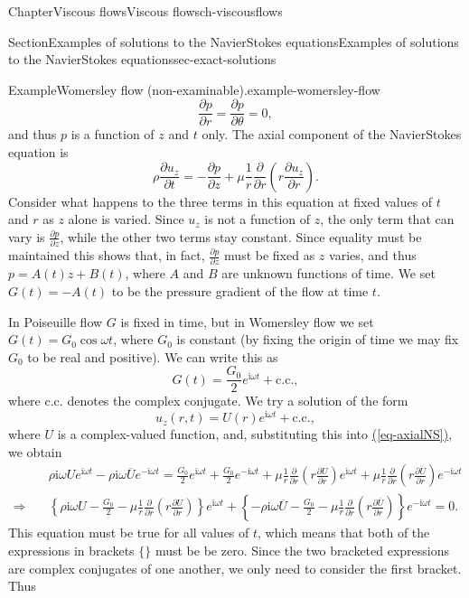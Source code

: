 \documentclass[oneside,10pt,]{book}
\newcommand{\xreffont}{\relax}
\numberwithin{equation}{section}
\newcommand{\im}{\mathrm{i}}
\newcommand{\pd}[2]{\frac{\partial#1}{\partial#2}}
\begin{document}
\begin{chapterptx}{Chapter}{Viscous flows}{}{Viscous flows}{}{}{ch-viscousflows}
\begin{sectionptx}{Section}{Examples of solutions to the Navier\textendash{}Stokes equations}{}{Examples of solutions to the Navier\textendash{}Stokes equations}{}{}{sec-exact-solutions}
\begin{example}{Example}{Womersley flow (non-examinable).}{example-womersley-flow}
\begin{equation*}
\pd{p}{r}=\pd{p}{\theta}=0,
\end{equation*}
and thus \(p\) is a function of \(z\) and \(t\) only. The axial component of the Navier\textendash{}Stokes equation is%
\begin{equation}
\rho\pd{u_z}{t}=-\pd{p}{z}+\mu\frac1r\pd{}{r}\left(r\pd{u_z}{r}\right).\label{eq-axialNS}
\end{equation}
Consider what happens to the three terms in this equation at fixed values of \(t\) and \(r\) as \(z\) alone is varied. Since \(u_z\) is not a function of \(z\), the only term that can vary is \(\pd{p}{z}\), while the other two terms stay constant. Since equality must be maintained this shows that, in fact, \(\pd{p}{z}\) must be fixed as \(z\) varies, and thus \(p=A(t)z+B(t)\), where \(A\) and \(B\) are unknown functions of time. We set \(G(t)=-A(t)\) to be the pressure gradient of the flow at time \(t\).%
\par
In Poiseuille flow \(G\) is fixed in time, but in Womersley flow we set \(G(t)=G_0\cos\omega t\), where \(G_0\) is constant (by fixing the origin of time we may fix \(G_0\) to be real and positive). We can write this as%
\begin{equation*}
G(t)=\frac{G_0}{2}e^{\im\omega t}+\mathrm{c.c.},
\end{equation*}
where \(\mathrm{c.c.}\) denotes the complex conjugate. We try a solution of the form%
\begin{equation}
u_z(r,t)=U(r)e^{\im\omega t}+\mathrm{c.c.},\label{eq-ansatz-uz}
\end{equation}
where \(U\) is a complex-valued function, and, substituting this into \hyperref[eq-axialNS]{({\xreffont\ref{eq-axialNS}})}, we obtain%
\begin{align*}
&\rho\im\omega Ue^{\im\omega t}-\rho\im\omega\overline{U}e^{-\im\omega t}
=\frac{G_0}2e^{\im\omega t}+\frac{G_0}2e^{-\im\omega t}
+\mu\frac1r\pd{}{r}\left(r\pd{U}{r}\right)e^{\im\omega t}+\mu\frac1r\pd{}{r}\left(r\pd{\overline{U}}{r}\right)e^{-\im\omega t}\\
\Rightarrow\quad&
\left\{\rho\im\omega U-\frac{G_0}2-\mu\frac1r\pd{}{r}\left(r\pd{U}{r}\right)\right\}e^{\im\omega t}
+\left\{-\rho\im\omega\overline{U}-\frac{G_0}2-\mu\frac1r\pd{}{r}\left(r\pd{\overline{U}}{r}\right)\right\}e^{-\im\omega t}
=0.
\end{align*}
This equation must be true for all values of \(t\), which means that both of the expressions in brackets \(\{\}\) must be be zero. Since the two bracketed expressions are complex conjugates of one another, we only need to consider the first bracket. Thus%

\end{example}
\end{sectionptx}
\end{chapterptx}
\end{document}
